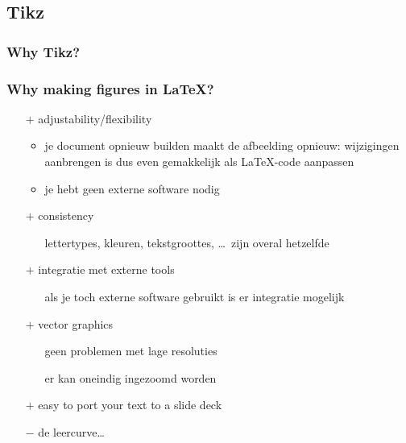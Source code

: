 \subsection{Tikz}
\def\Point{36.9}

\subsubsection{Why Tikz?}
\begin{frame}
  \frametitle{Why making figures in \LaTeX?}

  \begin{itemize}
    \item[$+$] adjustability/flexibility
      \begin{itemize}
        \item je document opnieuw builden maakt de afbeelding opnieuw: wijzigingen aanbrengen is dus even gemakkelijk als \LaTeX-code aanpassen
        \item je hebt geen externe software nodig
      \end{itemize}
      \pause
    \item[$+$] consistency
      \begin{itemize}
        \item[] lettertypes, kleuren, tekstgroottes, \ldots\ zijn overal hetzelfde
      \end{itemize}
      \pause 
    \item[$+$] integratie met externe tools
      \begin{itemize}
        \item[] als je toch externe software gebruikt is er integratie mogelijk
      \end{itemize}
      \pause
    \item[$+$] vector graphics
      \begin{itemize}
        \item[] geen problemen met lage resoluties
        \item[] er kan oneindig ingezoomd worden
      \end{itemize}
      \pause
    \item[$+$] easy to port your text to a slide deck
      \pause
    \item[$-$] de leercurve\ldots
  \end{itemize}
  \let\thefootnote\relax{}
\end{frame}

